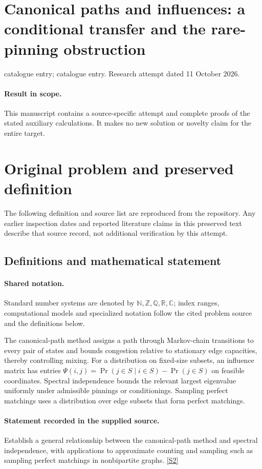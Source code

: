 \documentclass[11pt]{article}
\begin{document}
\section*{Canonical paths and influences: a conditional transfer and the rare-pinning obstruction}
\noindent catalogue entry; catalogue entry. Research attempt dated 11 October 2026.
\paragraph{Result in scope.}This manuscript contains a source-specific attempt and complete proofs of the stated auxiliary calculations. It makes no new solution or novelty claim for the entire target.
\section{Original problem and preserved definition}
The following definition and source list are reproduced from the repository. Any earlier inspection dates and reported literature claims in this preserved text describe that source record, not additional verification by this attempt.
\subsection{Definitions and mathematical statement}

\paragraph{Shared notation.}Standard number systems are denoted by $\mathbb N,\mathbb Z,\mathbb Q,\mathbb R,\mathbb C$; index ranges, computational models and specialized notation follow the cited problem source and the definitions below.


The canonical-path method assigns a path through Markov-chain transitions to every pair of states and bounds congestion relative to stationary edge capacities, thereby controlling mixing. For a distribution on fixed-size subsets, an influence matrix has entries $\Psi(i,j)=\Pr(j\in S\mid i\in S)-\Pr(j\in S)$ on feasible coordinates. Spectral independence bounds the relevant largest eigenvalue uniformly under admissible pinnings or conditionings. Sampling perfect matchings uses a distribution over edge subsets that form perfect matchings.
\paragraph{Statement recorded in the supplied source.}
Establish a general relationship between the canonical-path method and spectral independence, with applications to approximate counting and sampling such as sampling perfect matchings in nonbipartite graphs. \href{https://doi.org/10.4171/owr/2021/54}{[S2]}
\end{document}
